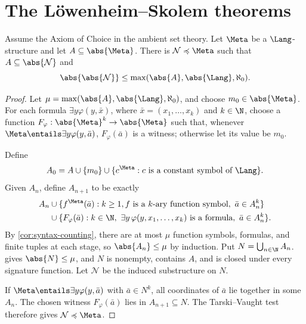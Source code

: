 \section{The L\"owenheim--Skolem theorems}
\label{sec:fol-cardinality-normalforms-02}

\begin{theorem}
\label{thm:downward-ls}
Assume the Axiom of Choice in the ambient set theory.  Let \(\Meta\) be a
\(\Lang\)-structure and let
\(A\subseteq\abs{\Meta}\).  There is
\(\mathcal N\preccurlyeq\Meta\) such that \(A\subseteq\abs{\mathcal N}\) and
\[
 \abs{\abs{\mathcal N}}
 \leq\max(\abs{A},\abs{\Lang},\aleph_0).
\]
\end{theorem}
\begin{proof}
Let \(\mu=\max(\abs{A},\abs{\Lang},\aleph_0)\), and choose
\(m_0\in\abs{\Meta}\).  For each formula
\(\exists y\varphi(y,\bar x)\), where
\(\bar x=(x_1,\ldots,x_k)\) and \(k\in\N\), choose a function
\(F_\varphi:\abs{\Meta}^{k}\to\abs{\Meta}\) such that, whenever
\(\Meta\entails\exists y\varphi(y,\bar a)\),
\(F_\varphi(\bar a)\) is a witness; otherwise let its value be \(m_0\).

Define
\[
 A_0=A\cup\{m_0\}\cup
 \{c^{\Meta}:c\text{ is a constant symbol of }\Lang\}.
\]
Given \(A_n\), define \(A_{n+1}\) to be exactly
\[
\begin{aligned}
 A_n
 &\cup\{f^{\Meta}(\bar a): k\geq1, f\text{ is a }k\text{-ary function
       symbol},\ \bar a\in A_n^k\}\\
 &\cup\{F_\varphi(\bar a): k\in\N,
       \ \exists y\,\varphi(y,x_1,\ldots,x_k)\text{ is a formula},
       \ \bar a\in A_n^k\}.
\end{aligned}
\]
By
\cref{cor:syntax-counting}, there are at most \(\mu\) function
symbols, formulas, and finite tuples at each stage, so
\(\abs{A_n}\leq\mu\) by induction.  Put
\(N=\bigcup_{n\in\N}A_n\).   gives
\(\abs{N}\leq\mu\), and \(N\) is nonempty,
contains \(A\), and is closed under every signature function.  Let
\(\mathcal N\) be the induced substructure on \(N\).

If \(\Meta\entails\exists y\varphi(y,\bar a)\) with \(\bar a\in N^k\), all
coordinates of \(\bar a\) lie together in some \(A_n\).  The chosen witness
\(F_\varphi(\bar a)\) lies in \(A_{n+1}\subseteq N\).  The Tarski--Vaught test
therefore gives \(\mathcal N\preccurlyeq\Meta\).
\end{proof}

